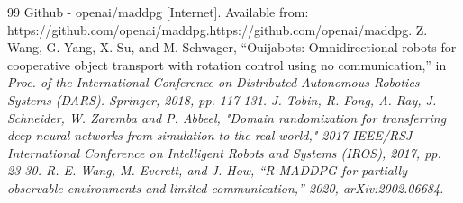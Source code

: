\documentclass[letterpaper, 10 pt, conference]{ieeeconf} %
\begin{document}
\begin{thebibliography}{99}
 Github - openai/maddpg [Internet]. Available from: https://github.com/openai/maddpg.https://github.com/openai/maddpg.
 Z. Wang, G. Yang, X. Su, and M. Schwager, “Ouijabots: Omnidirectional robots for cooperative object transport with rotation control using no communication,” in \it{}Proc. of the International Conference on Distributed Autonomous Robotics Systems (DARS)\rm{}. Springer, 2018, pp. 117-131.
 J. Tobin, R. Fong, A. Ray, J. Schneider, W. Zaremba and P. Abbeel, "Domain randomization for transferring deep neural networks from simulation to the real world," \it{}2017 IEEE/RSJ International Conference on Intelligent Robots and Systems (IROS)\rm{}, 2017, pp. 23-30.
 R. E. Wang, M. Everett, and J. How, ``R-MADDPG for partially observable environments and limited communication,'' 2020, arXiv:2002.06684.
\end{thebibliography}
%
%
\end{document}
